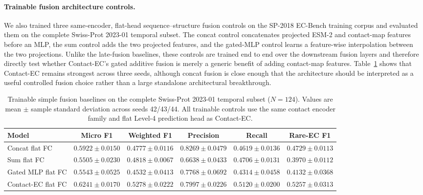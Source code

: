 \documentclass[11pt,a4paper]{article}
\begin{document}
\paragraph{Trainable fusion architecture controls.}
We also trained three same-encoder, flat-head sequence--structure fusion
controls on the SP-2018 EC-Bench training corpus and evaluated them on the
complete Swiss-Prot 2023-01 temporal subset. The concat control concatenates
projected ESM-2 and contact-map features before an MLP, the sum control adds the
two projected features, and the gated-MLP control learns a feature-wise
interpolation between the two projections. Unlike the late-fusion baselines,
these controls are trained end to end over the downstream fusion layers and
therefore directly test whether Contact-EC's gated additive fusion is merely a
generic benefit of adding contact-map features. Table~\ref{tab:simple_fusion_seed_repeats}
shows that Contact-EC remains strongest across three seeds, although concat
fusion is close enough that the architecture should be interpreted as a useful
controlled fusion choice rather than a large standalone architectural
breakthrough.

\begin{table}[htbp]
\centering
\caption{Trainable simple fusion baselines on the complete Swiss-Prot 2023-01
temporal subset ($N=124$). Values are mean $\pm$ sample standard deviation across
seeds 42/43/44. All trainable controls use the same contact encoder family and
flat Level-4 prediction head as Contact-EC.}
\label{tab:simple_fusion_seed_repeats}
\small
\setlength{\tabcolsep}{4pt}
\begin{tabular}{lccccc}
\toprule
Model & Micro F1 & Weighted F1 & Precision & Recall & Rare-EC F1 \\
\midrule
Concat flat FC & $0.5922\pm0.0150$ & $0.4777\pm0.0116$ & $0.8269\pm0.0479$ & $0.4619\pm0.0136$ & $0.4729\pm0.0113$ \\
Sum flat FC & $0.5505\pm0.0230$ & $0.4818\pm0.0067$ & $0.6638\pm0.0433$ & $0.4706\pm0.0131$ & $0.3970\pm0.0112$ \\
Gated MLP flat FC & $0.5543\pm0.0525$ & $0.4532\pm0.0413$ & $0.7768\pm0.0692$ & $0.4314\pm0.0458$ & $0.4132\pm0.0368$ \\
Contact-EC flat FC & $\mathbf{0.6241\pm0.0170}$ & $\mathbf{0.5278\pm0.0222}$ & $0.7997\pm0.0226$ & $\mathbf{0.5120\pm0.0200}$ & $\mathbf{0.5257\pm0.0313}$ \\
\bottomrule
\end{tabular}
\end{table}
\end{document}
